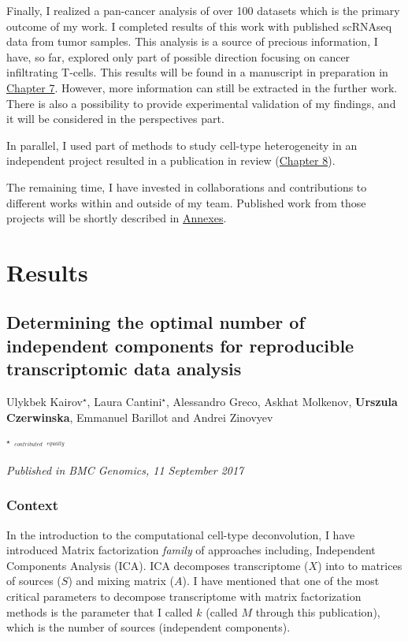 \documentclass[12pt,]{book}
\theoremstyle{definition}
\theoremstyle{definition}
\theoremstyle{definition}
\theoremstyle{remark}
\begin{document}
Finally, I realized a pan-cancer analysis of over 100 datasets which is
the primary outcome of my work. I completed results of this work with
published scRNAseq data from tumor samples. This analysis is a source of
precious information, I have, so far, explored only part of possible
direction focusing on cancer infiltrating T-cells. This results will be
found in a manuscript in preparation in
\protect\hyperlink{results}{Chapter 7}. However, more information can
still be extracted in the further work. There is also a possibility to
provide experimental validation of my findings, and it will be
considered in the perspectives part.

In parallel, I used part of methods to study cell-type heterogeneity in
an independent project resulted in a publication in review
(\protect\hyperlink{maps}{Chapter 8}).

The remaining time, I have invested in collaborations and contributions
to different works within and outside of my team. Published work from
those projects will be shortly described in
\protect\hyperlink{annexes}{Annexes}.

\hypertarget{part-results}{%
\part{Results}\label{part-results}}

\hypertarget{mstd}{%
\chapter{Determining the optimal number of independent components for
reproducible transcriptomic data analysis}\label{mstd}}


Ulykbek Kairov\(^\star\), Laura Cantini\(^\star\), Alessandro Greco,
Askhat Molkenov, \textbf{Urszula Czerwinska}, Emmanuel Barillot and
Andrei Zinovyev

\(^\star\) \(^{_{contributed}}\) \(^{_{equally}}\)

\emph{Published in BMC Genomics, 11 September 2017}

\hypertarget{context}{%
\section{Context}\label{context}}

In the introduction to the computational cell-type deconvolution, I have
introduced Matrix factorization \emph{family} of approaches including,
Independent Components Analysis (ICA). ICA decomposes transcriptome
(\(X\)) into to matrices of sources (\(S\)) and mixing matrix (\(A\)). I
have mentioned that one of the most critical parameters to decompose
transcriptome with matrix factorization methods is the parameter that I
called \(k\) (called \(M\) through this publication), which is the
number of sources (independent components).
\end{document}

